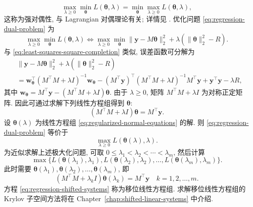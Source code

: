 \[\max_{\lambda\ge0}\min_{\boldsymbol{\theta}}L(\boldsymbol{\theta},\lambda)=\min_{\boldsymbol{\theta}}\max_{\lambda\ge0}L(\boldsymbol{\theta},\lambda),\]
{这称为强对偶性, 与 Lagrangian 对偶理论有关; 详情见 . 优化问题 \eqref{eq:regression-dual-problem} 为}
\begin{equation}\label{eq:regularized-regression-dual}
\max_{\lambda\ge0}\min_{\boldsymbol{\theta}}L(\boldsymbol{\theta},\lambda)\Leftrightarrow
\max_{\lambda\ge0}\min_{\boldsymbol{\theta}}\|\boldsymbol{y}-M\boldsymbol{\theta}\|_2^2+\lambda(\|\boldsymbol{\theta}\|_2^2-R).
\end{equation}
{与 \eqref{eq:least-squares-square-completion} 类似, 误差函数可分解为}
\[\begin{aligned}
&\|\boldsymbol{y}-M\boldsymbol{\theta}\|_2^2+\lambda(\|\boldsymbol{\theta}\|_2^2-R)\\
&=\boldsymbol{w}_{\boldsymbol{\theta}}^{\top}(M^{\top}M+\lambda I)^{-1}\boldsymbol{w}_{\boldsymbol{\theta}}-(M^{\top}\boldsymbol{y})^{\top}(M^{\top}M+\lambda I)^{-1}M^{\top}\boldsymbol{y}+\boldsymbol{y}^{\top}\boldsymbol{y}-\lambda R,
\end{aligned}\]
{其中 $\boldsymbol{w}_{\boldsymbol{\theta}}=M^{\top}\boldsymbol{y}-(M^{\top}M+\lambda I)\boldsymbol{\theta}$. 由于 $\lambda\ge0$, 矩阵 $M^{\top}M+\lambda I$ 为对称正定矩阵. 因此可通过求解下列线性方程组得到 $\boldsymbol{\theta}$:}
\begin{equation}\label{eq:regularized-normal-equations}
(M^{\top}M+\lambda I)\boldsymbol{\theta}=M^{\top}\boldsymbol{y}.
\end{equation}
{设 $\boldsymbol{\theta}(\lambda)$ 为线性方程组 \eqref{eq:regularized-normal-equations} 的解. 则 \eqref{eq:regression-dual-problem} 等价于}
\[\max_{\lambda\ge0}L(\boldsymbol{\theta}(\lambda),\lambda).\]
{为近似求解上述极大化问题, 可取 $0\le\lambda_1<\lambda_2<\cdots<\lambda_m$, 然后计算}
\[\max\{L(\boldsymbol{\theta}(\lambda_1),\lambda_1),L(\boldsymbol{\theta}(\lambda_2),\lambda_2),\ldots,L(\boldsymbol{\theta}(\lambda_m),\lambda_m)\}.\]
{此时需要 $\boldsymbol{\theta}(\lambda_1),\boldsymbol{\theta}(\lambda_2),\ldots,\boldsymbol{\theta}(\lambda_m)$, 即}
\begin{equation}\label{eq:regression-shifted-systems}
(M^{\top}M+\lambda_k I)\boldsymbol{\theta}(\lambda_k)=M^{\top}\boldsymbol{y}\quad k=1,2,\ldots,m.
\end{equation}
{方程 \eqref{eq:regression-shifted-systems} 称为移位线性方程组. 求解移位线性方程组的 Krylov 子空间方法将在 Chapter\ \ref{chap:shifted-linear-systems} 中介绍.}
